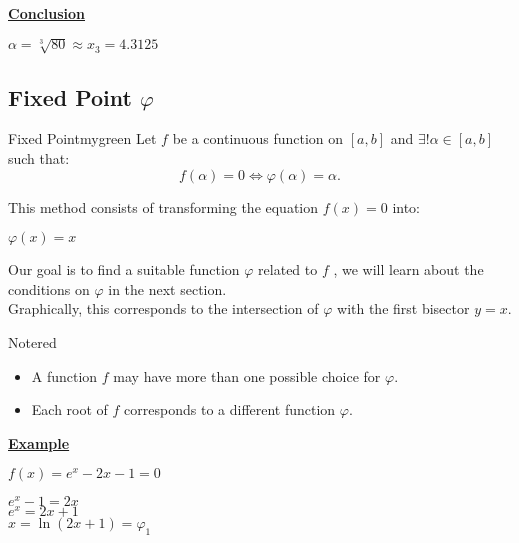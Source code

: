 \vspace{0.2cm}
\textbf{\underline{Conclusion}}
\begin{center}
    \(\boxed{\alpha = \sqrt[3]{80} \approx x_3 = 4.3125}\)
\end{center}

\subsection{Fixed Point \(\varphi\)}
\begin{prettyBox}{Fixed Point}{mygreen}
Let \( f \) be a continuous function on \([a, b]\) and \(\exists!\alpha \in [a, b]\) such that:
\[
f(\alpha) = 0 \iff \varphi(\alpha) = \alpha.
\]

\vspace{0.15cm}

This method consists of transforming the equation \( f(x) = 0 \) into:

\begin{center}
    \(\boxed{\varphi(x) = x}\)
\end{center}

\vspace{0.15cm}
Our goal is to find a suitable function \(\varphi\) related to \( f \) , we will
learn about the conditions on \(\varphi\) in the next section.\\[0.1cm]
Graphically, this corresponds to the intersection of \(\varphi\) with the first bisector \( y = x \).
\end{prettyBox}

\vspace{0.5cm}
\begin{prettyBox}{Note}{red}
\begin{itemize}
    \item A function \( f \) may have more than one possible choice for 
\(\varphi\).
    \item Each root of \( f \) corresponds to a different function \(\varphi\).
\end{itemize}
\end{prettyBox}

\vspace{1cm}
\textbf{\underline{Example}}
\begin{center}
\(f(x) = e^{x} - 2x - 1 = 0\)
\end{center}

\vspace{0.25cm}

\begin{center}
    \(e^{x} - 1 = 2x\)\\[0.1cm]
    \(e^{x} = 2x + 1\)\\[0.1cm]
    \(\boxed{x = \ln(2x+1) = \varphi_{1}}\)
\end{center}

